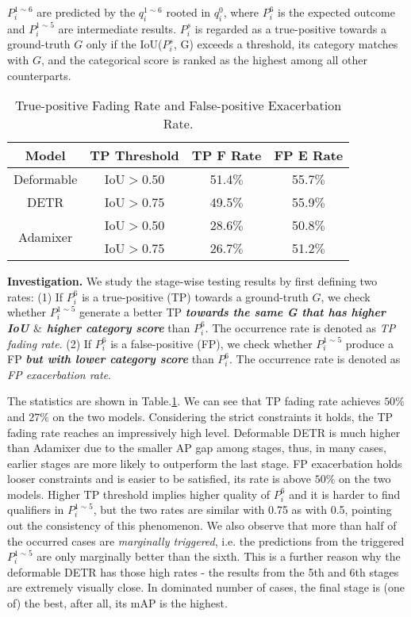 \documentclass[10pt,twocolumn,letterpaper]{article}
\begin{document}
\noindent $P_i^{1\sim 6}$ are predicted by the $q_i^{1\sim 6}$ rooted in $q_i^0$, where $P_i^6$ is the expected outcome and $P_i^{1\sim 5}$ are intermediate results.
$P_i^s$ is regarded as a true-positive towards a ground-truth $G$ only if the IoU($P_i^s$, G) exceeds a threshold, its category matches with $G$, and the categorical score is ranked as the highest among all other counterparts.


\begin{table}[]
    \centering
    \begin{tabular}{c|c|c|c}
        \toprule[1pt]
        Model       & TP Threshold & TP F Rate & FP E Rate \\ 
        \midrule
        Deformable & IoU$>$0.50 & 51.4$\%$ & 55.7$\%$ \\ 
        DETR & IoU$>$0.75 & 49.5$\%$ & 55.9$\%$ \\ \midrule
        \multirow{2}{*}{Adamixer} & IoU$>$0.50 & 28.6$\%$ & 50.8$\%$ \\
         & IoU$>$0.75 & 26.7$\%$ & 51.2$\%$  \\
        \bottomrule
    \end{tabular}
    \caption{True-positive Fading Rate and False-positive Exacerbation Rate. }
    \label{tab:fade_grace}
\end{table}


\textbf{Investigation.} We study the stage-wise testing results by first defining two rates: (1) If $P_i^6$ is a true-positive (TP) towards a ground-truth $G$, we check whether $P_i^{1\sim 5}$ generate a better TP \textit{\textbf{towards the same G that has higher IoU $\&$ higher category score}} than $P_i^6$. The occurrence rate is denoted as \textit{TP fading rate}. (2) If $P_i^6$ is a false-positive (FP), we check whether $P_i^{1\sim 5}$ produce a FP \textit{\textbf{but with lower category score}} than $P_i^6$. The occurrence rate is denoted as \textit{FP exacerbation rate}. 


The statistics are shown in Table.\ref{tab:fade_grace}. We can see that TP fading rate achieves $50\%$ and $27\%$ on the two models. Considering the strict constraints it holds, the TP fading rate reaches an impressively high level. Deformable DETR is much higher than Adamixer due to the smaller AP gap among stages, thus, in many cases, earlier stages are more likely to outperform the last stage. FP exacerbation holds looser constraints and is easier to be satisfied, its rate is above $50\%$ on the two models. Higher TP threshold implies higher quality of $P_i^6$ and it is harder to find qualifiers in $P_i^{1\sim 5}$, but the two rates are similar with 0.75 as with 0.5, pointing out the consistency of this phenomenon. We also observe that more than half of the occurred cases are \textit{marginally triggered}, i.e. the predictions from the triggered $P_i^{1\sim 5}$ are only marginally better than the sixth. This is a further reason why the deformable DETR has those high rates - the results from the 5th and 6th stages are extremely visually close. In dominated number of cases, the final stage is (one of) the best, after all, its mAP is the highest. 
\end{document}
